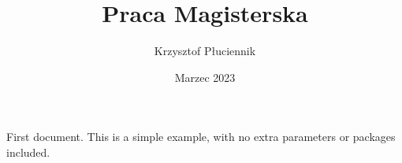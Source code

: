 \documentclass[12pt, letterpaper]{article}
\title{Praca Magisterska}
\author{Krzysztof Płuciennik}
\date{Marzec 2023}
\begin{document}
\maketitle
First document. This is a simple example, with no 
extra parameters or packages included.
\end{document}
